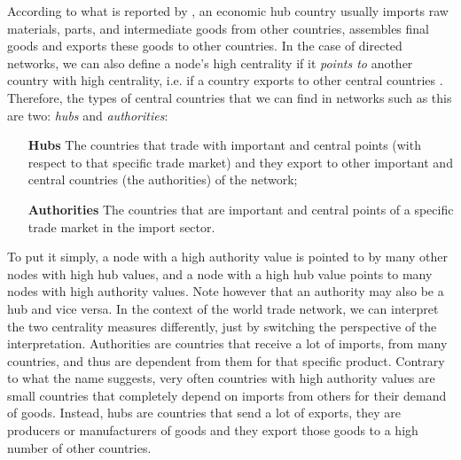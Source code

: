According to what is reported by \textcite{deguchi2014}, an economic hub country usually imports raw materials, parts, and intermediate goods from other countries, assembles final goods and exports these goods to other countries. %
In the case of directed networks, we can also define a node's high centrality if it \textit{points to} another country with high centrality, i.e. if a country exports to other central countries \cite{sajedianfard2021quantitative}. Therefore, the types of central countries that we can find in networks such as this are two: \textit{hubs} and \textit{authorities}:
\begin{itemize}
    \item[\textbf{Hubs}] The countries that trade with important and central points (with respect to that specific trade market) and they export to other important and central countries (the authorities) of the network;
    \item[\textbf{Authorities}] The countries that are important and central points of a specific trade market in the import sector.
\end{itemize}
To put it simply, a node with a high authority value is pointed to by many other nodes with high hub values, and a node with a high hub value points to many nodes with high authority values. Note however that an authority may also be a hub and vice versa. In the context of the world trade network, we can interpret the two centrality measures differently, just by switching the perspective of the interpretation. Authorities are countries that receive a lot of imports, from many countries, and thus are dependent from them for that specific product. Contrary to what the name suggests, very often countries with high authority values are small countries that completely depend on imports from others for their demand of goods. Instead, hubs are countries that send a lot of exports, they are producers or manufacturers of goods and they export those goods to a high number of other countries.


\pagebreak
